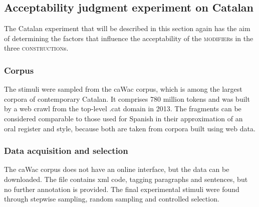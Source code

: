  
 
 
\subsection{Acceptability judgment experiment on Catalan}\label{sec:catepevexp}
The  Catalan experiment that will be described in this section again has the aim of determining the factors that influence the acceptability of the \textsc{modifier}s in the three \textsc{construction}s.

\subsubsection{Corpus} The stimuli were sampled from the caWac corpus, which is among the largest corpora of contemporary Catalan. It comprises 780 million tokens and was built by a web crawl from the top-level .cat domain in 2013. The fragments can be considered comparable to those used for Spanish  in their approximation of an oral register and style, because both are taken from corpora built using web data. 
\subsubsection{Data acquisition and selection} The caWac corpus does not have an online interface, but the data can be downloaded. The file contains xml code, tagging paragraphs and sentences, but no further annotation is provided. The final experimental stimuli were found through stepwise sampling, random sampling and controlled selection.

